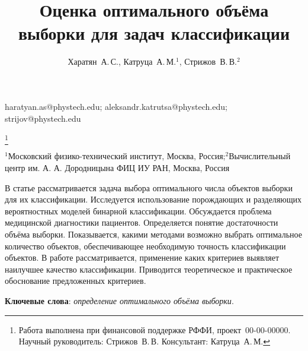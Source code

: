 \documentclass[12pt,twoside]{article}
\begin{document}
\title
    {Оценка оптимального объёма выборки для задач классификации}
\author
    {Харатян~А.\,С., Катруца~А.\,М.$^1$, Стрижов~В.\,В.$^2$} %
\email
	{haratyan.as@phystech.edu; aleksandr.katrutsa@phystech.edu; strijov@phystech.edu}

\thanks
    {Работа выполнена при финансовой поддержке РФФИ, проект \No\,00-00-00000.
     Научный руководитель:  Стрижов~В.\,В.
     Консультант:  Катруца~А.\,М.}

\organization
    {$^1$Московский физико-технический институт, Москва, Россия;$^2$Вычислительный центр им. А. А. Дородницына ФИЦ ИУ РАН, Москва, Россия}
    
\abstract
	{В статье рассматривается задача выбора оптимального числа объектов выборки для их классификации. Исследуется использование порождающих и разделяющих вероятностных моделей бинарной классификации. Обсуждается проблема медицинской диагностики пациентов. Определяется понятие достаточности объёма выборки. Показывается, какими методами возможно выбрать оптимальное количество объектов, обеспечивающее необходимую точность классификации объектов. В работе рассматривается, применение каких критериев выявляет наилучшее качество классификации. Приводится теоретическое и практическое обоснование предложенных критериев.

\bigskip
\noindent
\textbf{Ключевые слова}: \emph {определение оптимального объёма выборки}.

}



\maketitle
\end{document}
